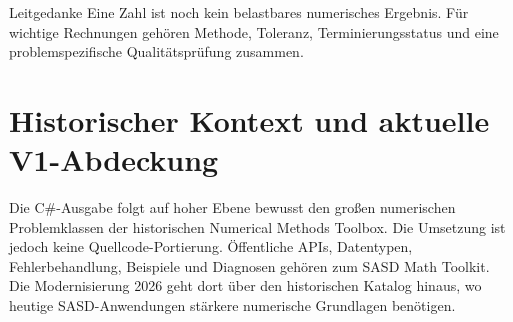 \documentclass[11pt,a4paper,twoside,openright]{book}
\begin{document}
\begin{sasdtip}{Leitgedanke}
Eine Zahl ist noch kein belastbares numerisches Ergebnis. Für wichtige Rechnungen gehören Methode, Toleranz, Terminierungsstatus und eine problemspezifische Qualitätsprüfung zusammen.
\end{sasdtip}

\tableofcontents
\clearpage
\mainmatter















\appendix
\chapter{Historischer Kontext und aktuelle V1-Abdeckung}
Die C\#-Ausgabe folgt auf hoher Ebene bewusst den großen numerischen Problemklassen der historischen Numerical Methods Toolbox. Die Umsetzung ist jedoch keine Quellcode-Portierung. Öffentliche APIs, Datentypen, Fehlerbehandlung, Beispiele und Diagnosen gehören zum SASD Math Toolkit. Die Modernisierung 2026 geht dort über den historischen Katalog hinaus, wo heutige SASD-Anwendungen stärkere numerische Grundlagen benötigen.
\end{document}

